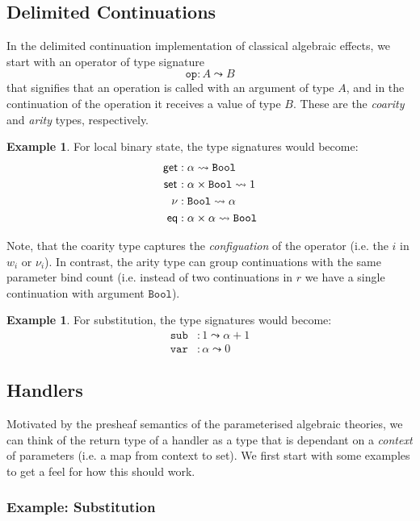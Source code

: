 \documentclass{scrartcl}
\theoremstyle{definition}
\newtheorem{example}[theorem]{Example}
\newcommand{\op}{\mathtt{op}}
\newcommand{\Bool}{\mathtt{Bool}}
\newcommand{\sub}{\mathtt{sub}}
\newcommand{\var}{\mathtt{var}}
\begin{document}
\subsection{Delimited Continuations}

In the delimited continuation implementation of classical algebraic effects, we start with an operator of type signature
\[
    \op: A \leadsto B
\]
that signifies that an operation is called with an argument of type $A$, and in the continuation of the operation it receives a value of type $B$.
These are the \emph{coarity} and \emph{arity} types, respectively.

\begin{example}
For local binary state, the type signatures would become:
\begin{align*}
    \get &: \alpha \leadsto \Bool \\
    \set{} &: \alpha \times \Bool \leadsto 1 \\
    \nu  &: \Bool \leadsto \alpha \\
    \eq  &: \alpha \times \alpha \leadsto \Bool
\end{align*}
\end{example}

Note, that the coarity type captures the \emph{configuation} of the operator (i.e. the $i$ in $w_i$ or $\nu_i$).
In contrast, the arity type can group continuations with the same parameter bind count (i.e. instead of two continuations in $r$ we have a single continuation with argument $\Bool$).

\begin{example}
For substitution, the type signatures would become:
\begin{align*}
    \sub &: 1 \leadsto \alpha + 1 \\
    \var &: \alpha \leadsto 0
\end{align*}
\end{example}

\subsection{Handlers}

Motivated by the presheaf semantics of the parameterised algebraic theories, we can think of the return type of a handler as a type that is dependant on a \emph{context} of parameters (i.e. a map from context to set). We first start with some examples to get a feel for how this should work.

\subsubsection{Example: Substitution}
\end{document}
